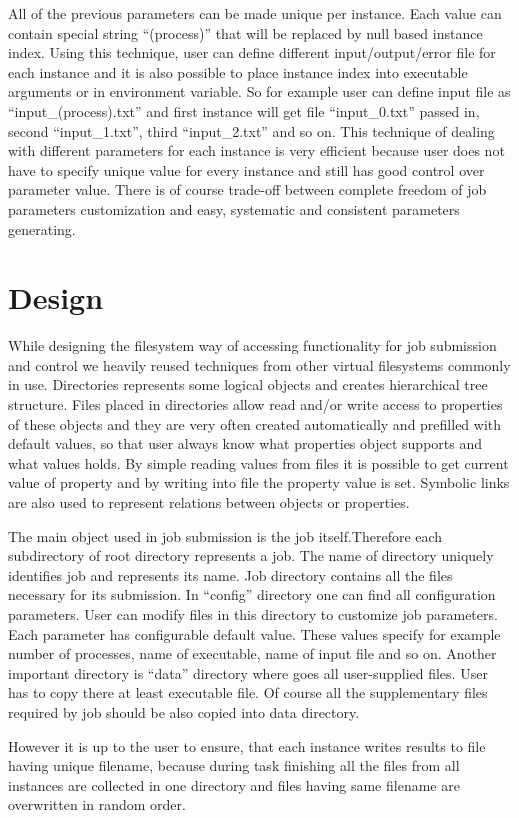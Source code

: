 \documentclass[a4paper,10pt,twocolumn]{article}
\newcommand{\term}[1]{``#1''}
\newcommand{\code}[1]{``#1''}
\begin{document}
All of the previous parameters can be made unique per instance. Each value can contain special string \code{\textdollar(process)} that will be replaced by null based instance index. Using this technique, user can define different input/output/error file for each instance and it is also possible to place instance index into executable arguments or in environment variable. So for example user can define input file as \code{input\_\textdollar(process).txt} and first instance will get file \code{input\_0.txt} passed in, second \code{input\_1.txt}, third \code{input\_2.txt} and so on. This technique of dealing with different parameters for each instance is very efficient because user does not have to specify unique value for every instance and still has good control over parameter value. There is of course trade-off between complete freedom of job parameters customization and easy, systematic and consistent parameters generating.



\section{Design}

While designing the filesystem way of accessing functionality for job submission and control we heavily reused techniques from other virtual filesystems commonly in use. Directories represents some logical objects and creates hierarchical tree structure. Files placed in directories allow read and/or write access to properties of these objects and they are very often created automatically and prefilled with default values, so that user always know what properties object supports and what values holds. By simple reading values from files it is possible to get current value of property and by writing into file the property value is set. Symbolic links are also used to represent relations between objects or properties.

The main object used in job submission is the job itself.Therefore each subdirectory of root directory represents a job. The name of directory uniquely identifies job and represents its name. Job directory contains all the files necessary for its submission. In \term{config} directory one can find all configuration parameters. User can modify files in this directory to customize job parameters. Each parameter has configurable default value. These values specify for example number of processes, name of executable, name of input file and so on. Another important directory is \term{data} directory where goes all user-supplied files. User has to copy there at least executable file. Of course all the supplementary files required by job should be also copied into data directory. 

However it is up to the user to ensure, that each instance writes results to file having unique filename, because during task finishing all the files from all instances are collected in one directory and files having same filename are overwritten in random order.
\end{document}
